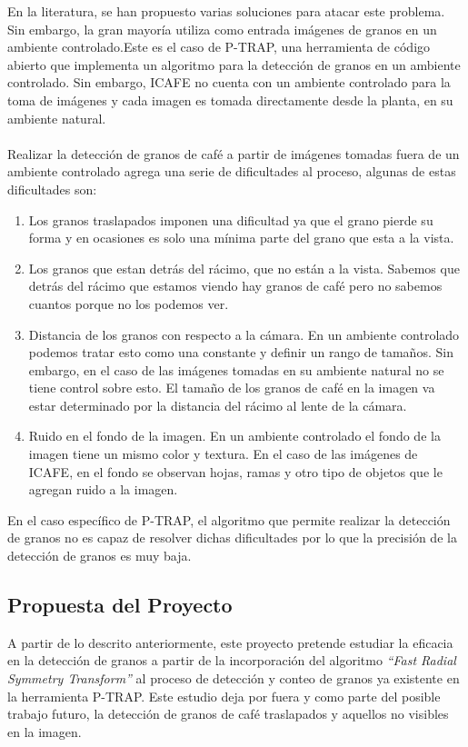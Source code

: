 En la literatura, se han propuesto varias soluciones para atacar este problema. Sin embargo, la gran mayor\'ia utiliza como entrada im\'agenes de granos en un ambiente controlado.Este es el caso de P-TRAP, una herramienta de c\'odigo abierto que implementa un algoritmo para la detecci\'on de granos en un ambiente controlado. Sin embargo, ICAFE no cuenta con un ambiente controlado para la toma de im\'agenes y cada imagen es tomada directamente desde la planta, en su ambiente natural. 
\\\\
Realizar la detecci\'on de granos de caf\'e a partir de im\'agenes tomadas fuera de un ambiente controlado agrega una serie de dificultades al proceso, algunas de estas dificultades son:
\begin{enumerate}
    \item Los granos traslapados imponen una dificultad ya que el grano pierde su forma y en ocasiones es solo una m\'inima parte del grano que esta a la vista.
    \item Los granos que estan detr\'as del r\'acimo, que no est\'an a la vista. Sabemos que detr\'as del r\'acimo que estamos viendo hay granos de caf\'e pero no sabemos cuantos porque no los podemos ver.
    \item Distancia de los granos con respecto a la c\'amara. En un ambiente controlado podemos tratar esto como una constante y definir un rango de tama\~nos. Sin embargo, en el caso de las im\'agenes tomadas en su ambiente natural no se tiene control sobre esto. El tama\~no de los granos de caf\'e en la imagen va estar determinado por la distancia del r\'acimo al lente de la c\'amara.
    \item Ruido en el fondo de la imagen. En un ambiente controlado el fondo de la imagen tiene un mismo color y textura. En el caso de las im\'agenes de ICAFE, en el fondo se observan hojas, ramas y otro tipo de objetos que le agregan ruido a la imagen.
\end{enumerate}
En el caso espec\'ifico de P-TRAP, el algoritmo que permite realizar la detecci\'on de granos no es capaz de resolver dichas dificultades por lo que la precisi\'on de la detecci\'on de granos es muy baja. 
\subsection{Propuesta del Proyecto}
A partir de lo descrito anteriormente, este proyecto pretende estudiar la eficacia en la detecci\'on de granos a partir de la incorporaci\'on del algoritmo \textit{“Fast Radial Symmetry Transform”}\cite{loyzelinsky} al proceso de detecci\'on y conteo de granos ya existente en la herramienta P-TRAP\cite{ptrap}. Este estudio deja por fuera y como parte del posible trabajo futuro, la detecci\'on de granos de caf\'e traslapados y aquellos no visibles en la imagen.
